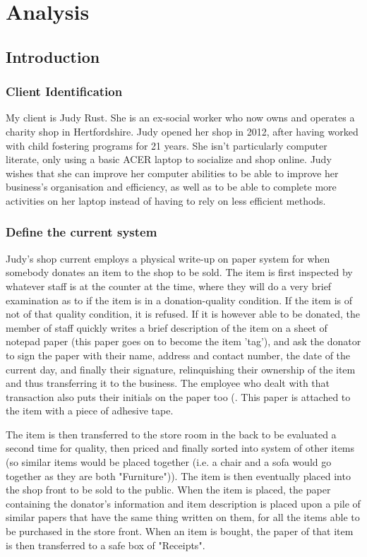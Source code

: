 \chapter{Analysis}

\section{Introduction}

\subsection{Client Identification}
My client is Judy Rust. She is an ex-social worker who now owns and operates a charity shop in Hertfordshire. Judy opened her shop in 2012, after having worked with child fostering programs for 21 years. She isn't particularly computer literate, only using a basic ACER laptop to socialize and shop online. Judy wishes that she can improve her computer abilities to be able to improve her business's organisation and efficiency, as well as to be able to complete more activities on her laptop instead of having to rely on less efficient methods.
\subsection{Define the current system}
Judy's shop current employs a physical write-up on paper system for when somebody donates an item to the shop to be sold. The item is first inspected by whatever staff is at the counter at the time, where they will do a very brief examination as to if the item is in a donation-quality condition. If the item is of not of that quality condition, it is refused. If it is however able to be donated, the member of staff quickly writes a brief description of the item on a sheet of notepad paper (this paper goes on to become the item 'tag'), and ask the donator to sign the paper with their name, address and contact number, the date of the current day, and finally their signature, relinquishing their ownership of the item and thus transferring it to the business. The employee who dealt with that transaction also puts their initials on the paper too (. This paper is attached to the item with a piece of adhesive tape.

 The item is then transferred to the store room in the back to be evaluated a second time for quality, then priced and finally sorted into system of other items (so similar items would be placed together (i.e. a chair and a sofa would go together as they are both "Furniture")). The item is then eventually placed into the shop front to be sold to the public. When the item is placed, the paper containing the donator's information and item description is placed upon a pile of similar papers that have the same thing written on them, for all the items able to be purchased in the store front. When an item is bought, the paper of that item is then transferred to a safe box of "Receipts".
